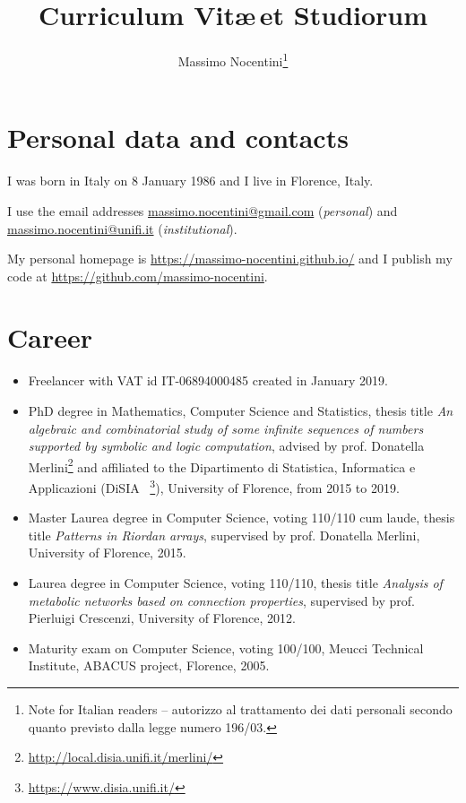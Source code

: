 \documentclass[a4paper]{article} %
\begin{document}
    \title{Curriculum Vit\ae\,et Studiorum}

    \author{Massimo Nocentini\footnote{Note for Italian readers -- autorizzo al trattamento dei dati
		 	personali secondo quanto previsto dalla legge numero 196/03.}
    }

    \maketitle

    \section{Personal data and contacts}
    
    I was born in Italy on 8 January 1986 and I live in Florence, Italy. 

	I use the email addresses \url{massimo.nocentini@gmail.com} (\emph{personal}) and
	\url{massimo.nocentini@unifi.it} (\emph{institutional}).

	My personal homepage is \url{https://massimo-nocentini.github.io/}
	and I publish my code at \url{https://github.com/massimo-nocentini}.


    \section{Career}

    \begin{itemize}
		\item Freelancer with VAT id IT-06894000485 created in January 2019.
        \item PhD degree in Mathematics, Computer Science and Statistics,
        thesis title \emph{An algebraic and combinatorial study of some
        infinite sequences of numbers supported by symbolic and logic
        computation}, advised by prof.  Donatella
        Merlini\footnote{\url{http://local.disia.unifi.it/merlini/}} and
        affiliated to the Dipartimento di Statistica, Informatica e
        Applicazioni (DiSIA~ \footnote{\url{https://www.disia.unifi.it/}}),
        University of Florence, from 2015 to 2019.
        \item Master Laurea degree in Computer Science, voting 110/110 cum laude, thesis title \emph{Patterns in Riordan arrays}, 
            supervised by prof. Donatella Merlini, University of Florence, 2015.
        \item Laurea degree in Computer Science, voting 110/110, thesis title \emph{Analysis of metabolic networks based on connection properties}, 
            supervised by prof. Pierluigi Crescenzi, University of Florence, 2012.
        \item Maturity exam on Computer Science, voting 100/100, Meucci Technical Institute, ABACUS project, Florence, 2005.
    \end{itemize}
\end{document}
